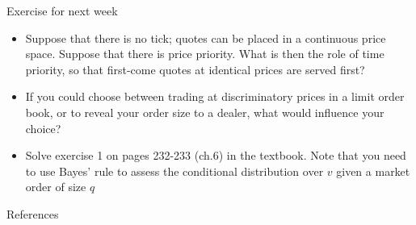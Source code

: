 \documentclass[english,10pt]{beamer}
\begin{document}
\begin{frame}{Exercise for next week}
	\begin{itemize}
		\item Suppose that there is no tick; quotes can  be placed in a continuous price space. Suppose that there is price priority. What is then the role of time priority, so that first-come quotes at identical prices are served first?
		\item If you could choose between trading at discriminatory prices in a limit order book, or to reveal your order size to a dealer, what would influence your choice?
		\item Solve exercise 1 on pages 232-233 (ch.6) in the textbook. Note that you need to use Bayes' rule to assess the conditional distribution over $v$ given a market order of size $q$
	\end{itemize}
\end{frame}





\appendix
\begin{frame}[allowframebreaks]{References}
	
	
\end{frame}
\end{document}
